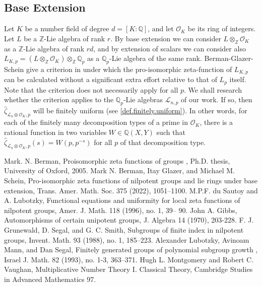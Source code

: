 \documentclass[12pt]{article}
\begin{document}
\subsection{Base Extension}
Let $K$ be a number field of degree $d=[K:\mathbb{Q}]$, and let $\mathcal{O}_K$ be its ring of integers. Let $L$ be a $\mathbb{Z}$-Lie algebra of rank $r$. By base extension we can consider $L\otimes_{\mathbb{Z}}\mathcal{O}_K$ as a $\mathbb{Z}$-Lie algebra of rank $rd$, and by extension of scalars we can consider also $L_{K,p}=(L\otimes_{\mathbb{Z}}\mathcal{O}_K)\otimes_{\mathbb{Z}}\mathbb{Q}_p$ as a $\mathbb{Q}_p$-Lie algebra of the same rank. Berman-Glazer-Schein give a criterion in \cite{BermanGlazerSchein} under which the pro-isomorphic zeta-function of $L_{K,p}$ can be calculated without a significant extra effort relative to that of $L_p$ itself. Note that the criterion does not necessarily apply for all $p$. We shall research whether the criterion applies to the $\mathbb{Q}_p$-Lie algebras $\mathcal{L}_{n,p}$ of our work. If so, then $\hat\zeta_{\mathcal{L}_n\otimes\mathcal{O}_K,p}$ will be finitely uniform (see \ref{def.finitely.uniform}). In other words, for each of the finitely many decomposition types of a prime in $\mathcal{O}_K$, there is a rational function in two variables $W\in\mathbb{Q}(X,Y)$ such that $\hat\zeta_{\mathcal{L}_n\otimes\mathcal{O}_K,p}(s)=W(p,p^{-s})$ for all $p$ of that decomposition type.
\begin{thebibliography}{2}
 Mark. N. Berman,
Proisomorphic zeta functions of groups
, Ph.D. thesis, University of Oxford,
2005.
 Mark N. Berman, Itay Glazer, and Michael M. Schein, Pro-isomorphic zeta functions of nilpotent groups and lie rings under base extension, Trans. Amer. Math. Soc. 375 (2022), 1051–1100.
 M.P.F. du Sautoy and A. Lubotzky, Functional equations and uniformity for
local zeta functions of nilpotent groups, Amer. J. Math. 118 (1996), no. 1, 39–
90.
 John A. Gibbs, Automorphisms of certain unipotent groups, J. Algebra 14 (1970), 203-228.
 F. J. Grunewald, D. Segal, and G. C. Smith, Subgroups of finite index in nilpotent groups,
Invent. Math. 93 (1988), no. 1, 185–223.
 Alexander Lubotzky, Avinoam Mann, and Dan Segal,
Finitely generated groups of polynomial
subgroup growth
, Israel J. Math.
82
(1993), no. 1-3, 363–371.
 Hugh L. Montgomery and Robert C. Vaughan, Multiplicative Number Theory I. Classical Theory, Cambridge Studies in Advanced Mathematics 97.
\end{thebibliography}
\end{document}
